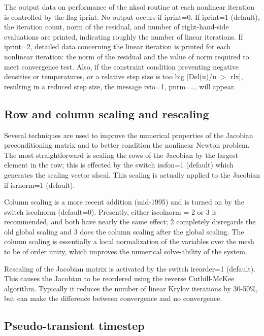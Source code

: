 \documentclass [12pt]{article}
\begin{document}
The output data on performance of the {\sf nksol} routine at each nonlinear
iteration is controlled by the flag iprint.  No output occurs if iprint=0.
If iprint=1 (default), the iteration count, norm of the residual, and
number of right-hand-side evaluations are printed, indicating roughly the
number of linear iterations.  If iprint=2, detailed data concerning the
linear iteration is printed for each nonlinear iteration:  the norm of the
residual and the value of norm required to meet convergence test.  Also, if
the constraint condition preventing negative densities or temperatures, or
a relative step size is too big [Del(u)/u $>$ rlx], resulting in a reduced
step size, the message {\sf ivio=1, pnrm=...} will appear.

\subsection{Row and column scaling and rescaling}

Several techniques are used to improve the numerical properties of the
Jacobian preconditioning matrix and to better condition the nonlinear
Newton problem.  The most straightforward is scaling the rows of the
Jacobian by the largest element in the row; this is effected by the switch
{\sf issfon=1} (default) which generates the scaling vector sfscal.  This
scaling is actually applied to the Jacobian if {\sf isrnorm=1} (default).

Column scaling is a more recent addition (mid-1995) and is turned on by the
switch iscolnorm (default=0).  Presently, either iscolnorm = 2 or 3 is
recommended, and both have nearly the same effect; 2 completely disregards
the old global scaling and 3 does the column scaling after the global
scaling.  The column scaling is essentially a local normalization of the
variables over the mesh to be of order unity, which improves the numerical 
solve-ability of the system.

Rescaling of the Jacobian matrix is activated by the switch {\sf ireorder=1}
(default).  This causes the Jacobian to be reordered using the reverse
Cuthill-McKee algorithm.  Typically it reduces the number of linear Krylov
iterations by 30-50\%, but can make the difference between convergence and
no convergence.

\subsection{Pseudo-transient timestep}
\end{document}
